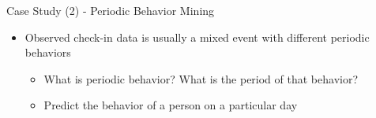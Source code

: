 \documentclass[
 size=14pt,
 paper=smartboard,  %
 mode=present, 		%
 display=slides, 	%
 style=tuliplab,  	%
 pauseslide,
 fleqn,leqno]{powerdot}{}
\begin{document}
\begin{slide}[toc=,bm=]{Case Study (2) - Periodic Behavior Mining}

\begin{itemize}
\item
Observed check-in data is usually a mixed event with different periodic behaviors

\begin{itemize}
\item
What is periodic behavior?
What is the period of that behavior?

\item
Predict the behavior of a person on a particular day
\end{itemize}
\end{itemize}



\end{slide}
\end{document}
